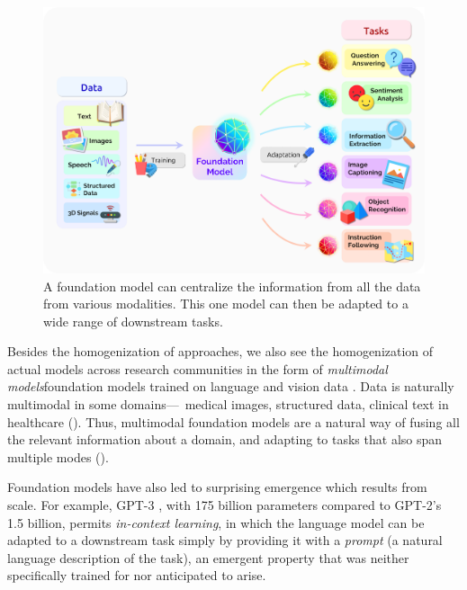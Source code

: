 \begin{figure}[t]
\centering
\includegraphics[width=\linewidth]{figures/Intro_Framework.png}
\caption{
\label{fig:framework}
A foundation model can centralize the information from all the data from various modalities.
This one model can then be adapted to a wide range of downstream tasks.
}
\end{figure}

Besides the homogenization of approaches,
we also see the homogenization of actual models across research communities in the form of \emph{multimodal models}\dash{}\eg{}foundation models trained on language and vision data
\citep{luo2020univl,kim2021vilt,cho2021unifying,ramesh2021zeroshot,radford2021learning}.
Data is naturally multimodal in some domains---\eg~medical images, structured data, clinical text in healthcare ().
Thus, multimodal foundation models are a natural way of fusing all the relevant information about a domain,
and adapting to tasks that also span multiple modes ().

Foundation models have also led to surprising emergence which results from scale.
For example, GPT-3 \citep{brown2020gpt3}, with 175 billion parameters compared to GPT-2's 1.5 billion,
permits \emph{in-context learning}, in which the language model can be adapted to a downstream task simply by
providing it with a \emph{prompt} (a natural language description of the task),
an emergent property that was neither specifically trained for nor anticipated to arise.


